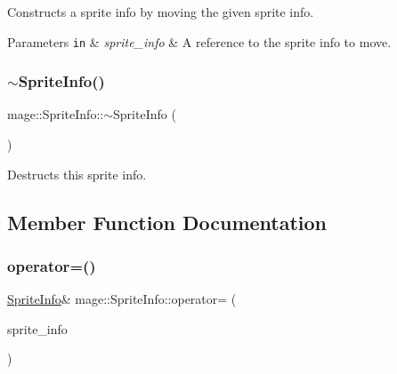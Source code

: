 Constructs a sprite info by moving the given sprite info.


\begin{DoxyParams}[1]{Parameters}
\mbox{\tt in}  & {\em sprite\+\_\+info} & A reference to the sprite info to move. \\
\hline
\end{DoxyParams}
\hypertarget{structmage_1_1_sprite_info_a17d9161b88c7f920419ae9aaf8c11299}{}\label{structmage_1_1_sprite_info_a17d9161b88c7f920419ae9aaf8c11299} 
\subsubsection{\texorpdfstring{$\sim$\+Sprite\+Info()}{~SpriteInfo()}}
{\footnotesize\ttfamily mage\+::\+Sprite\+Info\+::$\sim$\+Sprite\+Info (\begin{DoxyParamCaption}{ }\end{DoxyParamCaption})\hspace{0.3cm}{\ttfamily [default]}}

Destructs this sprite info. 

\subsection{Member Function Documentation}
\hypertarget{structmage_1_1_sprite_info_a843c253e10ec7fd90412b5adb6ccc17f}{}\label{structmage_1_1_sprite_info_a843c253e10ec7fd90412b5adb6ccc17f} 
\subsubsection{\texorpdfstring{operator=()}{operator=()}\hspace{0.1cm}{\footnotesize\ttfamily [1/2]}}
{\footnotesize\ttfamily \hyperlink{structmage_1_1_sprite_info}{Sprite\+Info}\& mage\+::\+Sprite\+Info\+::operator= (\begin{DoxyParamCaption}\item[{const \hyperlink{structmage_1_1_sprite_info}{Sprite\+Info} \&}]{sprite\+\_\+info }\end{DoxyParamCaption})\hspace{0.3cm}{\ttfamily [default]}}


